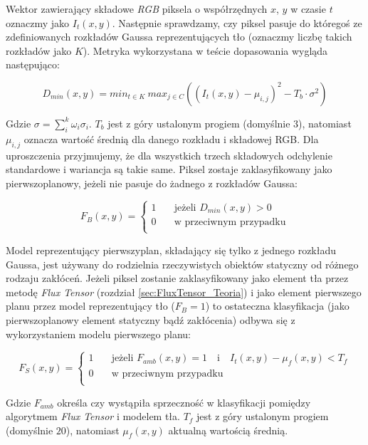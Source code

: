\documentclass[10pt,a4paper]{article}
\begin{document}
Wektor zawierający składowe \textit{RGB} piksela o współrzędnych $x$, $y$ w czasie $t$ oznaczmy jako $I_t(x,y)$. Następnie sprawdzamy, czy piksel pasuje do któregoś ze zdefiniowanych rozkładów Gaussa reprezentujących tło (oznaczmy liczbę takich rozkładów jako $K$). Metryka wykorzystana w teście dopasowania wygląda następująco:

\begin{equation}
D_{min}(x,y) = min_{t \in K} \: max_{j \in C} ((I_t(x,y)-\mu_{i,j})^2-T_b \cdot \sigma ^2)
\label{equ:d_min}
\end{equation}

\noindent Gdzie $\sigma = \sum_{i}^{k} \omega_i \sigma_i$. $T_b$ jest z góry ustalonym progiem (domyślnie $3$), natomiast $\mu_{i,j}$ oznacza wartość średnią dla danego rozkładu i składowej RGB. Dla uproszczenia przyjmujemy, że dla wszystkich trzech składowych odchylenie standardowe i wariancja są takie same. Piksel zostaje zaklasyfikowany jako pierwszoplanowy, jeżeli nie pasuje do żadnego z rozkładów Gaussa:

\begin{equation}
F_B(x,y) = 
\begin{cases}
1 & \quad \text{jeżeli } D_{min}(x,y)>0\\
0 & \quad \text{w przeciwnym przypadku}\\
\end{cases}
\label{equ:F_B}
\end{equation}

Model reprezentujący pierwszyplan, składający się tylko z jednego rozkładu Gaussa, jest używany do rodzielnia rzeczywistych obiektów statyczny od różnego rodzaju zakłóceń. Jeżeli piksel zostanie zaklasyfikowany jako element tła przez metodę \textit{Flux Tensor} (rozdział \ref{sec:FluxTensor_Teoria}) i jako element pierwszego planu przez model reprezentujący tło ($F_B = 1$) to ostateczna klasyfikacja (jako pierwszoplanowy element statyczny bądź zakłócenia) odbywa się z wykorzystaniem modelu pierwszego planu:

\begin{equation}
F_S(x,y) =
\begin{cases}
1 & \quad \text{jeżeli } F_{amb}(x,y)=1 \quad \text{i} \quad I_t(x,y)-\mu_f(x,y) < T_f \\
0 & \quad \text{w przeciwnym przypadku}\\
\end{cases}
\label{equ:F_S}
\end{equation}

\noindent Gdzie $F_{amb}$ określa czy wystąpiła sprzeczność w klasyfikacji pomiędzy algorytmem \textit{Flux Tensor} i modelem tła. $T_f$ jest z góry ustalonym progiem (domyślnie $20$), natomiast $\mu_f(x,y)$ aktualną wartością średnią.
\end{document}
